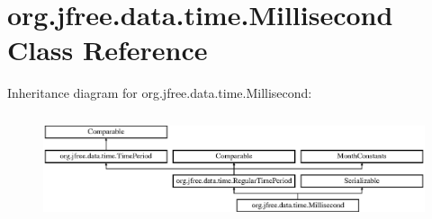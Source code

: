 \hypertarget{classorg_1_1jfree_1_1data_1_1time_1_1_millisecond}{}\section{org.\+jfree.\+data.\+time.\+Millisecond Class Reference}
\label{classorg_1_1jfree_1_1data_1_1time_1_1_millisecond}
Inheritance diagram for org.\+jfree.\+data.\+time.\+Millisecond\+:\begin{figure}[H]
\begin{center}
\leavevmode
\includegraphics[height=3.190883cm]{classorg_1_1jfree_1_1data_1_1time_1_1_millisecond}
\end{center}
\end{figure}
